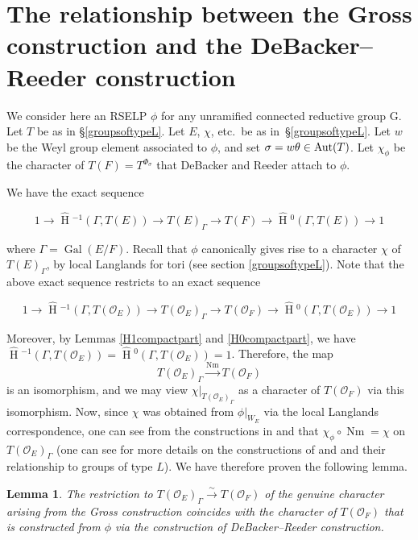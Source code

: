 \documentclass[11pt]{amsart}
\theoremstyle{plain}
\newtheorem{lemma}[theorem]{Lemma}
\newcommand{\HT}[1]{\hat{\HH}{}^{#1}}
\theoremstyle{definition}
\DeclareMathOperator{\Gal}{Gal}
\DeclareMathOperator{\HH}{H}
\DeclareMathOperator{\Nm}{Nm}
\begin{document}
\section{The relationship between the Gross construction and the DeBacker--Reeder construction}\label{grossdebackerreeder}

We consider here an RSELP $\phi$ for any unramified connected
reductive group G.  Let $T$ be as in \S\ref{groupsoftypeL}.  Let $E$,
$\chi$, etc.~be as in~\S\ref{groupsoftypeL}.  Let $w$ be the Weyl
group element associated to $\phi$, and set $\sigma = w \theta\in {\rm Aut}(T)$.
Let $\chi_{\phi}$ be the character of $T(F) = T^{\Phi_{\sigma}}$ that
DeBacker and Reeder attach to $\phi$.

We have the exact sequence

$$1 \rightarrow \HT{-1}(\Gamma, T(E)) \rightarrow T(E)_{\Gamma} \rightarrow T(F)
  \rightarrow \HT{0}(\Gamma, T(E)) \rightarrow 1$$

where $\Gamma = \Gal(E/F)$.  Recall that $\phi$ canonically gives
rise to a character $\chi$ of $T(E)_{\Gamma}$, by local Langlands
for tori (see section \ref{groupsoftypeL}).  Note that the above
exact sequence restricts to an exact sequence

$$1 \rightarrow \HT{-1}(\Gamma, T(\mathcal{O}_E)) \rightarrow T(\mathcal{O}_E)_{\Gamma}
  \rightarrow T(\mathcal{O}_F) \rightarrow \HT{0}(\Gamma, T(\mathcal{O}_E)) \rightarrow 1$$

Moreover, by Lemmas \ref{H1compactpart} and \ref{H0compactpart}, we have
$\HT{-1}(\Gamma, T(\mathcal{O}_E)) = \HT{0}(\Gamma, T(\mathcal{O}_E)) = 1$.
Therefore, the map
$$T(\mathcal{O}_E)_{\Gamma} \xrightarrow{\Nm} T(\mathcal{O}_F)$$
is an isomorphism, and we may view
$\chi|_{T(\mathcal{O}_E)_{\Gamma}}$ as a character of
$T(\mathcal{O}_F)$ via this isomorphism.  Now, since $\chi$ was
obtained from $\phi|_{W_E}$ via the local Langlands correspondence, one can see
from the constructions in \cite{debackerreeder} and \cite{reeder} that
$\chi_{\phi} \circ \Nm = \chi$ on $T(\mathcal{O}_E)_{\Gamma}$ (one can see
\cite{adrianlansky} for more details on the constructions of
\cite{debackerreeder} and \cite{reeder} and their relationship to groups of
type $L$).
We have therefore proven the following lemma.

\begin{lemma}\label{grossanddebackerreedercompatibility}
  The restriction to $T(\mathcal{O}_E)_{\Gamma} \xrightarrow{\sim} T(\mathcal{O}_F)$
  of the genuine character arising from the Gross construction
  coincides with the character of $T(\mathcal{O}_F)$ that is
  constructed from $\phi$ via the construction of DeBacker--Reeder
  construction.
\end{lemma}
\end{document}

